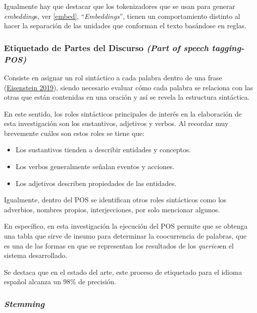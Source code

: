 \documentclass[
  12pt,
  openany]{book}
\begin{document}
Igualmente hay que destacar que los tokenizadores que se usan para generar \emph{embedding}s, ver \ref{embed}, ``\emph{Embeddings}'', tienen un comportamiento distinto al hacer la separación de las unidades que conforman el texto basándose en reglas.

\hypertarget{pos}{%
\subsubsection{\texorpdfstring{Etiquetado de Partes del Discurso \emph{(Part of speech tagging-POS)}}{Etiquetado de Partes del Discurso (Part of speech tagging-POS)}}\label{pos}}

Consiste en asignar un rol sintáctico a cada palabra dentro de una frase (\protect\hyperlink{ref-eisenstein2019}{Eisenstein 2019}), siendo necesario evaluar cómo cada palabra se relaciona con las otras que están contenidas en una oración y así se revela la estructura sintáctica.

En este sentido, los roles sintácticos principales de interés en la elaboración de esta investigación son los sustantivos, adjetivos y verbos. Al recordar muy brevemente cuáles son estos roles se tiene que:

\begin{itemize}
\item
  Los sustantivos tienden a describir entidades y conceptos.
\item
  Los verbos generalmente señalan eventos y acciones.
\item
  Los adjetivos describen propiedades de las entidades.
\end{itemize}

Igualmente, dentro del POS se identifican otros roles sintácticos como los adverbios, nombres propios, interjecciones, por solo mencionar algunos.

En específico, en esta investigación la ejecución del POS permite que se obtenga una tabla que sirve de insumo para determinar la coocurrencia de palabras, que es una de las formas en que se representan los resultados de los \emph{queries}en el sistema desarrollado.

Se destaca que en el estado del arte, este proceso de etiquetado para el idioma español alcanza un 98\% de precisión.

\hypertarget{steaming}{%
\subsubsection{\texorpdfstring{\emph{Stemming}}{Stemming}}\label{steaming}}
\end{document}
